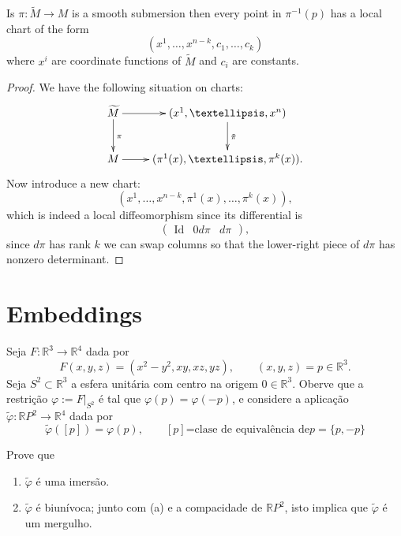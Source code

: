 \begin{theorem}
\label{theorem-regular-level-set}
Is $\pi:\widetilde{M}\to M$
is a smooth submersion then every point
in $\pi^{-1}(p)$ has a local chart of
the form
$$
(x^1,…,x^{n-k},c_1,…,c_k)
$$
where $x^i$ are coordinate functions of
$\widetilde{M}$ and $c_i$ are constants.
\end{theorem}

\begin{proof}
We have the following situation on charts:
$$
\xymatrix{
\widetilde{M}\ar[r]\ar[d]^{\pi}& (x^1,…,x^n)
\ar[d]^{\tilde{\pi}}\\
M \ar[r]& (\pi^1(x),…,\pi^k(x)).
}
$$
Now introduce a new chart:
$$
(x^1,…,x^{n-k},\pi^1(x),…,\pi^k(x)),
$$
which is indeed a local diffeomorphism
since its differential is
$$
\begin{pmatrix}
\text{Id}& 0
d\pi & d\pi
\end{pmatrix},
$$
since $d\pi$ has rank $k$ we can swap columns
so that the lower-right piece of $d\pi$
has nonzero determinant.

\end{proof}

\section{Embeddings}
\label{section-embeddings}

\begin{exercise}
\label{exercise-p2-in-r4}
Seja \(F:\mathbb{R}^3 \to \mathbb{R}^4\)
dada por
\[F(x,y,z)=(x^2-y^2,xy,xz,yz),\qquad
(x,y,z)=p \in \mathbb{R}^3.\]
Seja \(S^2 \subset \mathbb{R}^3\) a esfera
unitária com centro na origem \(0 \in
\mathbb{R}^3\). Oberve que a restrição \(
\varphi:= F|_{S^2}\) é tal que
\(\varphi(p)=\varphi(-p)\), e considere a
aplicação \(\tilde{\varphi}:\mathbb{R}P^2
\to
\mathbb{R}^4\) dada por
\[\tilde{\varphi}([p])=\varphi(p),\qquad
[p]\text{=clase de equivalência de
\(p=\{p,-p\}\)}\]

Prove que
\begin{enumerate}
\item \(\tilde{\varphi}\) é uma imersão.
\item \(\tilde{\varphi}\) é biunívoca;
junto com (a) e a compacidade de
\(\mathbb{R}P^2\), isto implica
que \(\tilde{\varphi}\) é um mergulho.
\end{enumerate}
\end{exercise}

